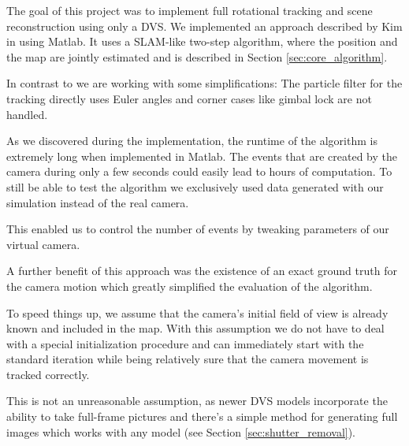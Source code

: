 The goal of this project was to implement full rotational tracking and scene
reconstruction using only a DVS. We implemented an approach described by Kim \etal
in \cite{kim2014simultaneous} using Matlab. It uses a SLAM-like two-step
algorithm, where the position and the map are jointly estimated and is
described in Section \ref{sec:core_algorithm}.

In contrast to \cite{kim2014simultaneous} we are working with some
simplifications: The particle filter for the tracking directly uses Euler
angles and corner cases like gimbal lock are not handled.

As we discovered during the implementation, the runtime of the algorithm is
extremely long when implemented in Matlab. The events that are created by the
camera during only a few seconds could easily lead to hours of computation.
To still be able to test the algorithm we exclusively used data generated with
our simulation instead of the real camera.

This enabled us to control the number of events by tweaking parameters of our
virtual camera.

A further benefit of this approach was the existence of an exact ground truth
for the camera motion which greatly simplified the evaluation of the algorithm.

To speed things up, we assume that the camera's initial field
of view is already known and included in the map. With this assumption we do
not have to deal with a special initialization procedure and can immediately
start with the standard iteration while being relatively sure that the camera
movement is tracked correctly.

This is not an unreasonable assumption, as newer DVS models incorporate the
ability to take full-frame pictures and there's a simple method for generating
full images which works with any model (see Section \ref{sec:shutter_removal}).
